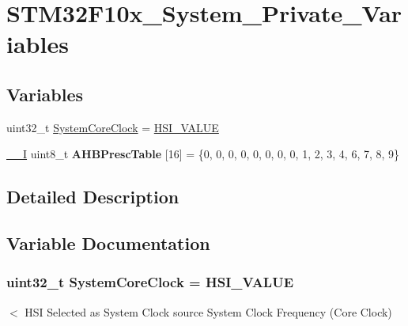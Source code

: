 \hypertarget{group___s_t_m32_f10x___system___private___variables}{\section{S\-T\-M32\-F10x\-\_\-\-System\-\_\-\-Private\-\_\-\-Variables}
\label{group___s_t_m32_f10x___system___private___variables}
}
\subsection*{Variables}
\begin{DoxyCompactItemize}
\item 
uint32\-\_\-t \hyperlink{group___s_t_m32_f10x___system___private___variables_gaa3cd3e43291e81e795d642b79b6088e6}{System\-Core\-Clock} = \hyperlink{group___library__configuration__section_gaaa8c76e274d0f6dd2cefb5d0b17fbc37}{H\-S\-I\-\_\-\-V\-A\-L\-U\-E}
\item 
\hypertarget{group___s_t_m32_f10x___system___private___variables_gacdc3ef54c0704c90e69a8a84fb2d970d}{\hyperlink{group___c_m_s_i_s__core__definitions_gaf63697ed9952cc71e1225efe205f6cd3}{\-\_\-\-\_\-\-I} uint8\-\_\-t {\bfseries A\-H\-B\-Presc\-Table} \mbox{[}16\mbox{]} = \{0, 0, 0, 0, 0, 0, 0, 0, 1, 2, 3, 4, 6, 7, 8, 9\}}\label{group___s_t_m32_f10x___system___private___variables_gacdc3ef54c0704c90e69a8a84fb2d970d}

\end{DoxyCompactItemize}


\subsection{Detailed Description}


\subsection{Variable Documentation}
\hypertarget{group___s_t_m32_f10x___system___private___variables_gaa3cd3e43291e81e795d642b79b6088e6}{
\subsubsection[{System\-Core\-Clock}]{\setlength{\rightskip}{0pt plus 5cm}uint32\-\_\-t System\-Core\-Clock = {\bf H\-S\-I\-\_\-\-V\-A\-L\-U\-E}}}\label{group___s_t_m32_f10x___system___private___variables_gaa3cd3e43291e81e795d642b79b6088e6}
$<$ H\-S\-I Selected as System Clock source System Clock Frequency (Core Clock) 